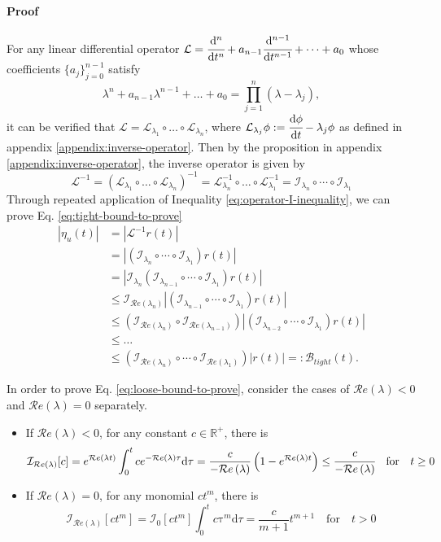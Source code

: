 \documentclass[accepted]{uai2023}
\newcommand{\dt}[1]{\cfrac{\mathrm{d} #1}{\mathrm{d} t}}
\newcommand{\dnt}[2]{\cfrac{\mathrm{d}^{#1} #2}{\mathrm{d} t^{#1}}}
\newcommand{\Err}{\eta}
\newcommand{\Bound}{\mathcal{B}}
\renewcommand{\L}{\mathcal{L}}
\newcommand{\I}{\mathcal{I}}
\renewcommand{\Re}[1]{\mathcal{R}e\left(#1\right)}
\begin{document}
\paragraph{Proof} For any linear differential operator $\L=\dnt{n}{} + a_{n-1}\dnt{n-1}{}+\dots+a_0$ whose coefficients $\{a_j\}_{j=0}^{n-1}$ satisfy 
\[
    \lambda^n + a_{n-1}\lambda^{n-1} + \dots +a_0 = \prod_{j=1}^{n} \left(\lambda - \lambda_j\right),
\]
it can be verified that $\L = \L_{\lambda_1} \circ\dots \circ \L_{\lambda_n}$, where $\L_{\lambda_j}\phi := \dt{\phi}-\lambda_j\phi$ as defined in appendix \ref{appendix:inverse-operator}. Then by the proposition in appendix \ref{appendix:inverse-operator}, the inverse operator is given by
\begin{equation}
    \L^{-1} = \left(\L_{\lambda_1} \circ\dots \circ \L_{\lambda_n}\right)^{-1} = \L_{\lambda_n}^{-1} \circ\dots \circ \L_{\lambda_1}^{-1} = \I_{\lambda_n} \circ\cdots\circ\I_{\lambda_1}
\end{equation}
Through repeated application of Inequality \ref{eq:operator-I-inequality}, we can prove Eq. \ref{eq:tight-bound-to-prove}
\begin{align}
    \left|\Err_{u}(t)\right| &= \left| \L^{-1} r(t) \right| \\
    &=\left|\left(\I_{\lambda_n} \circ\cdots\circ\I_{\lambda_1}\right) r(t)\right| \\
    &=\left|\I_{\lambda_n}\left(\I_{\lambda_{n-1}} \circ\cdots\circ\I_{\lambda_1}\right) r(t)\right| \\
    &\leq \I_{\Re{\lambda_n}}\left|\left(\I_{\lambda_{n-1}} \circ\cdots\circ\I_{\lambda_1}\right) r(t)\right| \\
    &\leq \left(\I_{\Re{\lambda_n}}\circ \I_{\Re{\lambda_{n-1}}}\right)\left|\left(\I_{\lambda_{n-2}} \circ\cdots\circ\I_{\lambda_1}\right) r(t)\right| \\
    &\leq \dots \nonumber \\
    &\leq \left(\I_{\Re{\lambda_n}}\circ \cdots \circ\I_{\Re{\lambda_{1}}}\right)\left|r(t)\right| =: \Bound_{tight}(t).
\end{align}

In order to prove Eq. \ref{eq:loose-bound-to-prove}, consider the cases of $\Re{\lambda} < 0$ and $\Re{\lambda} = 0$ separately.
\begin{itemize}
    \item If $\Re{\lambda} < 0$, for any constant $c\in \mathbb{R^{+}}$, there is \begin{equation} \I_{\Re{\lambda}} [c] = e^{\Re{\lambda t}} \int_{0}^{t} c e^{-\Re{\lambda}\tau} \mathrm{d}\tau = \frac{c}{-\Re{\lambda}} \left(1 - e^{\Re{\lambda} t}\right) \leq \cfrac{c}{-\Re{\lambda}}\quad \text{for} \quad t\geq0\end{equation}
    \item If $\Re{\lambda} = 0$, for any monomial $c t^{m}$, there is \begin{equation} \I_{\Re{\lambda }}[ct^m] = \I_{0}[ct^m] \int_{0}^{t} c\mathrm{\tau} ^m \mathrm{d}\tau = \frac{c}{m+1}t^{m+1} \quad\text{for}\quad t > 0 \end{equation}
\end{itemize}
\end{document}
